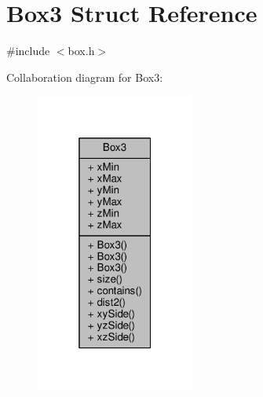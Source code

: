 \hypertarget{structBox3}{}\section{Box3 Struct Reference}
\label{structBox3}


{\ttfamily \#include $<$box.\+h$>$}



Collaboration diagram for Box3\+:
\nopagebreak
\begin{figure}[H]
\begin{center}
\leavevmode
\includegraphics[width=148pt]{structBox3__coll__graph}
\end{center}
\end{figure}
